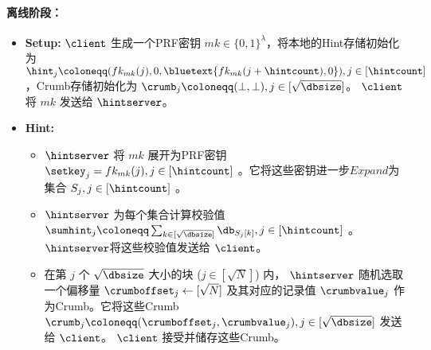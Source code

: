 \begin{mdframed}
        \paragraph{离线阶段：}
        \begin{itemize}
            \item \textbf{Setup:} $\client$ 生成一个PRF密钥 $mk\in\{0,1\}^\lambda$，将本地的Hint存储初始化为 $\hint_j\coloneqq(fk_{mk}(j),0,\bluetext{fk_{mk}(j+\hintcount),0}), j\in [\hintcount]$，Crumb存储初始化为 $\crumb_j\coloneqq (\bot,\bot), j\in [\sqrt{\dbsize}]$。 $\client$ 将 $mk$ 发送给 $\hintserver$。
            \item \textbf{Hint:}
                  \begin{itemize}
                      \item $\hintserver$ 将 $mk$ 展开为PRF密钥 $\setkey_j=fk_{mk}(j), j\in[\hintcount]$ 。它将这些密钥进一步$Expand$为集合 $S_j, j\in[\hintcount]$ 。
                      \item $\hintserver$ 为每个集合计算校验值 $\sumhint_j\coloneqq \sum_{k\in [\sqrt{\dbsize}]}\db_{S_{j}[k]}, j\in[\hintcount]$ 。$\hintserver$将这些校验值发送给 $\client$。
                      \item 在第 $j$ 个 $\sqrt{\dbsize}$ 大小的块 ($j\in[\sqrt{N}]$) 内， $\hintserver$ 随机选取一个偏移量 $\crumboffset_j\leftarrow [\sqrt{N}]$ 及其对应的记录值 $\crumbvalue_j$ 作为Crumb。它将这些Crumb $\crumb_j \coloneqq  (\crumboffset_j, \crumbvalue_j), j\in [\sqrt{\dbsize}]$ 发送给 $\client$。 $\client$ 接受并储存这些Crumb。
                  \end{itemize}
        \end{itemize}

\end{mdframed}
